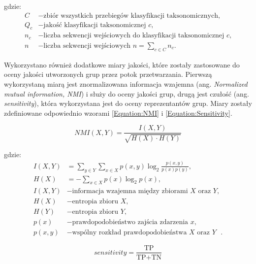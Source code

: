 \documentclass{article}
\begin{document}
{                gdzie:
                \begin{align*}
                  C &- \text{zbiór wszystkich przebiegów klasyfikacji taksonomicznych,} \\
                  Q_c &- \text{jakość klasyfikacji taksonomicznej $c$,} \\
                  n_c &- \text{liczba sekwencji wejściowych do klasyfikacji taksonomicznej $c$,}\\
                  n   &- \text{liczba sekwencji wejściowych $n = \sum_{c \in C} n_{c}.$}
                \end{align*}
        
                Wykorzystano również dodatkowe miary jakości, które zostały zastosowane do oceny jakości utworzonych grup przez potok przetwarzania. Pierwszą wykorzystaną miarą jest znormalizowana informacja wzajemna (ang. \textit{Normalized mutual information, NMI}) i służy do oceny jakości grup, drugą jest czułość (ang. \textit{sensitivity}), która wykorzystana jest do oceny reprezentantów grup. Miary zostały zdefiniowane odpowiednio wzorami \eqref{Equation:NMI} i \eqref{Equation:Sensitivity}.
        
                \begin{equation}
                    NMI(X, Y) = \frac{I(X, Y)}{\sqrt{H(X) \cdot H(Y)}}
                    \label{Equation:NMI}
                \end{equation}
        
                gdzie:
                \begin{align*}
                    I(X, Y) &= \sum_{y \in Y}{ \sum_{x \in X}{p(x, y) \log_{2}{\frac{p(x, y)}{p(x) p(y)}}}}, \\
                    H(X) &= - \sum_{x \in X}{ p(x) \log_{2}{p(x)}}, \\
                    I(X, Y) &- \text{informacja wzajemna między zbiorami $X$ oraz $Y$}, \\
                    H(X) &- \text{entropia zbioru $X$}, \\
                    H(Y) &- \text{entropia zbioru $Y$}, \\
                    p(x) &- \text{prawdopodobieństwo zajścia zdarzenia $x$}, \\
                    p(x, y) &- \text{wspólny rozkład prawdopodobieństwa $X$ oraz $Y$ }.
                \end{align*}
        
                \begin{equation}
                    sensitivity = \frac{\text{TP}}{
                        \text{TP} + \text{TN}
                    }
                    \label{Equation:Sensitivity}
                \end{equation}
        
}
\end{document}
